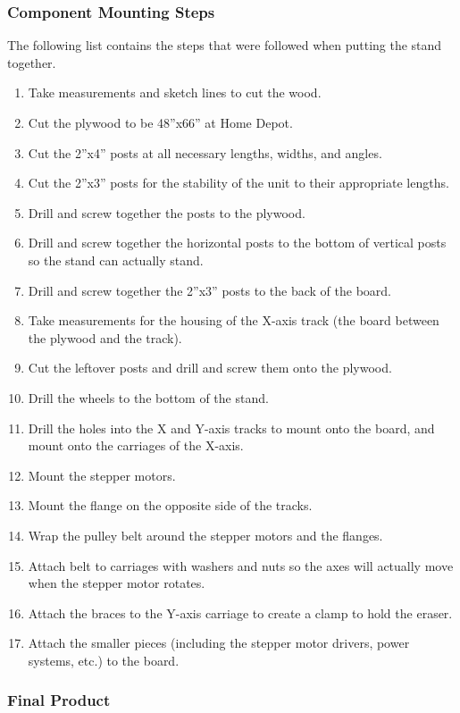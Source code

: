 \subsubsection{Component Mounting Steps}

The following list contains the steps that were followed when putting the stand together.

\begin{enumerate}
	\item Take measurements and sketch lines to cut the wood.
	\item Cut the plywood to be 48''x66'' at Home Depot.
	\item Cut the 2''x4'' posts at all necessary lengths, widths, and angles.
	\item Cut the 2''x3'' posts for the stability of the unit to their appropriate lengths.
	\item Drill and screw together the posts to the plywood.
	\item Drill and screw together the horizontal posts to the bottom of vertical posts so the stand can actually stand.
	\item Drill and screw together the 2''x3'' posts to the back of the board.
	\item Take measurements for the housing of the X-axis track (the board between the plywood and the track).
	\item Cut the leftover posts and drill and screw them onto the plywood.
	\item Drill the wheels to the bottom of the stand.
	\item Drill the holes into the X and Y-axis tracks to mount onto the board, and mount onto the carriages of the X-axis.
	\item Mount the stepper motors.
	\item Mount the flange on the opposite side of the tracks.
	\item Wrap the pulley belt around the stepper motors and the flanges.
	\item Attach belt to carriages with washers and nuts so the axes will actually move when the stepper motor rotates.
	\item Attach the braces to the Y-axis carriage to create a clamp to hold the eraser.
	\item Attach the smaller pieces (including the stepper motor drivers, power systems, etc.) to the board.
\end{enumerate}

\subsubsection{Final Product}

